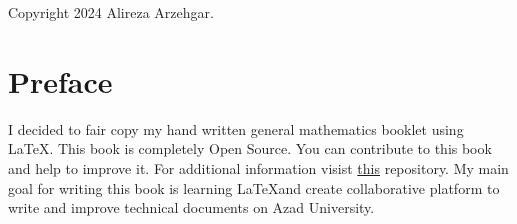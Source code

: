 \maketitle
\begin{center}
	Copyright 2024 Alireza Arzehgar.
\end{center}

\tableofcontents

\chapter{Preface}
I decided to fair copy my hand written general mathematics booklet using \LaTeX. This book is completely Open Source.
You can contribute to this book and help to improve it. For additional information visist \href{https://github.com/alirezaarzehgar/docs}{this} repository.
My main goal for writing this book is learning \LaTeX and create collaborative platform to write and improve technical documents on Azad University.
